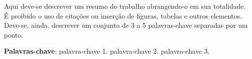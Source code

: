 \documentclass{TCC_UP}
\begin{document}
%

    \setlength{\absparsep}{18pt}
    \begin{resumo}
        Aqui deve-se descrever um resumo do trabalho abrangendo-o em sua totalidade. É proibido o uso de citações ou inserção de figuras, tabelas e outros elementos. Deve-se, ainda, descrever um conjunto de 3 a 5 palavras-chave separadas por um ponto.

        \textbf{Palavras-chave}: palavra-chave 1. palavra-chave 2. palavra-chave 3.
    \end{resumo}
\end{document}
